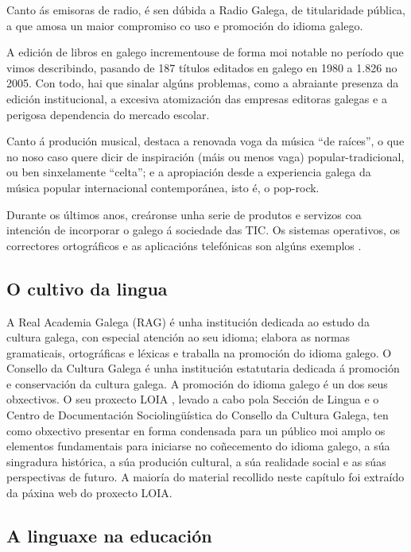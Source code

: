 \begin{multicols}{2}
Canto ás emisoras de radio, é sen dúbida a Radio Galega, de titularidade pública, a que amosa un maior compromiso co uso e promoción do idioma galego. 

A edición de libros en galego incrementouse de forma moi notable no período que vimos describindo, pasando de 187 títulos editados en galego en 1980 a 1.826 no 2005. Con todo, hai que sinalar algúns problemas, como a abraiante presenza da edición institucional, a excesiva atomización das empresas editoras galegas e a perigosa dependencia do mercado escolar. 

Canto á produción musical, destaca a renovada voga da música “de raíces”, o que no noso caso quere dicir de inspiración (máis ou menos vaga) popular-tradicional, ou ben sinxelamente “celta”; e a apropiación desde a experiencia galega da música popular internacional contemporánea, isto é, o pop-rock.

Durante os últimos anos, creáronse unha serie de produtos e servizos coa intención de incorporar o galego á sociedade das TIC. Os sistemas operativos, os correctores ortográficos e as aplicacións telefónicas son algúns exemplos \cite{GAL-Nota10}.

\subsection{O cultivo da lingua}

    A Real Academia Galega (RAG) \cite{GAL-Nota11} é unha institución dedicada ao estudo da cultura galega, con especial atención ao seu idioma; elabora as normas gramaticais, ortográficas e léxicas e traballa na promoción do idioma galego. 
O Consello da Cultura Galega \cite{GAL-Nota12} é unha institución estatutaria dedicada á promoción e conservación da cultura galega. A promoción do idioma galego é un dos seus obxectivos. O seu proxecto LOIA \cite{GAL-Nota13}, levado a cabo pola Sección de Lingua e o Centro de Documentación Sociolingüística do Consello da Cultura Galega, ten como obxectivo presentar en forma condensada para un público moi amplo os elementos fundamentais para iniciarse no coñecemento do idioma galego, a súa singradura histórica, a súa produción cultural, a súa realidade social e as súas perspectivas de futuro. A maioría do material recollido neste capítulo foi extraído da páxina web do proxecto LOIA.

 

\subsection{A linguaxe na educación}


\end{multicols}
